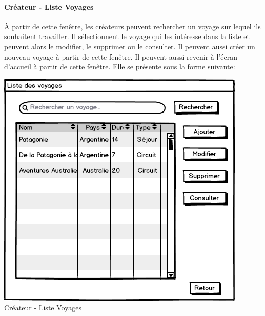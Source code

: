 \documentclass[11pt]{article}
\begin{document}
\paragraph{Créateur - Liste Voyages}
À partir de cette fenêtre, les créateurs peuvent rechercher un voyage sur lequel ils souhaitent travailler. Il sélectionnent le voyage qui les intéresse dans la liste et peuvent alors le modifier, le supprimer ou le consulter. Il peuvent aussi créer un nouveau voyage à partir de cette fenêtre. Il peuvent aussi revenir à l'écran d'accueil à partir de cette fenêtre. Elle se présente sous la forme suivante:
\begin{center}
\includegraphics[scale = 0.5]{../Conception_graphique/png_Pour_CR/Createur-20-Liste_Voyages.png}
\newline
Créateur - Liste Voyages
\label{fig:Cr-Liste_Voyage}
\end{center}
\end{document}
